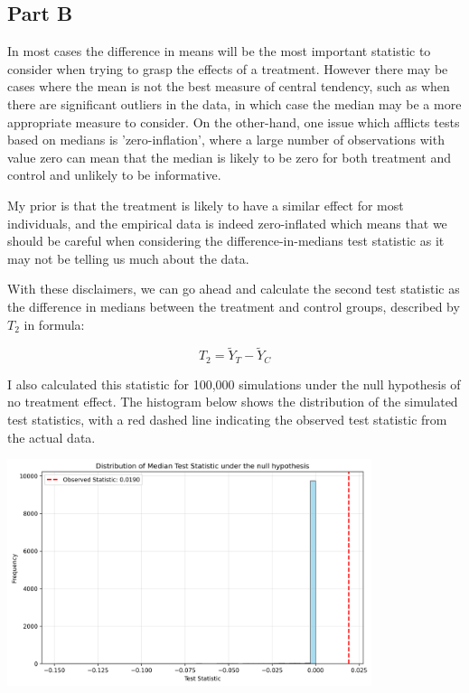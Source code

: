 \documentclass[12pt]{article}
\begin{document}
\subsection{Part B}

In most cases the difference in means will be the most important statistic to consider when trying to grasp the effects of a treatment. However there may be cases where the mean is not the best measure of central tendency, such as when there are significant outliers in the data, in which case the median may be a more appropriate measure to consider. On the other-hand, one issue which afflicts tests based on medians is 'zero-inflation', where a large number of observations with value zero can mean that the median is likely to be zero for both treatment and control and unlikely to be informative. 
\newline


My prior is that the treatment is likely to have a similar effect for most individuals, and the empirical data is indeed zero-inflated which means that we should be careful when considering the difference-in-medians test statistic as it may not be telling us much about the data.
\newline

With these disclaimers, we can go ahead and calculate the second test statistic as the difference in medians between the treatment and control groups, described by $T_2$ in formula:

\[T_2 = \tilde{Y}_T - \tilde{Y}_C\]

I also calculated this statistic for 100,000 simulations under the null hypothesis of no treatment effect. The histogram below shows the distribution of the simulated test statistics, with a red dashed line indicating the observed test statistic from the actual data.

\vspace*{2em}
\includegraphics[width=0.8\textwidth]{stat2_graph.png}
\vspace*{2em}
\end{document}
